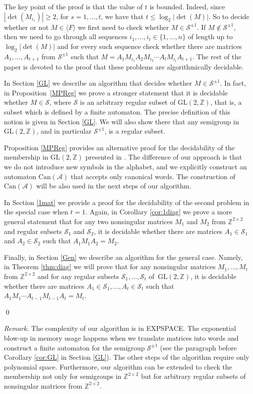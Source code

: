 \documentclass[fontsize=11pt,DIV=13,paper=letter]{scrartcl}
\theoremstyle{definition}
\newcommand{\la}{\langle}
\newcommand{\ra}{\rangle}
\newcommand{\A}{\mathcal{A}}
\newcommand{\Z}{\mathbb{Z}}
\newcommand{\s}{\mathcal{S}}
\newcommand{\GL}{\mathrm{GL}(2,\Z)}
\begin{document}
The key point of the proof is that the value of $t$ is bounded. Indeed, since $|\det(M_{i_s})|\geq 2$, for $s=1,\dots,t$, we have that $t\leq \log_2|\det(M)|$. So to decide whether or not $M\in \la F\ra$ we first need to check whether $M\in \s^{\pm 1}$. If $M\notin \s^{\pm 1}$, then we need to go through all sequences $i_1,\dots,i_t\in \{1,\dots,n\}$ of length up to $\log_2|\det(M)|$ and for every such sequence check whether there are matrices $A_1,\dots,A_{t+1}$ from $\s^{\pm 1}$ such that $M=A_1M_{i_1}A_2M_{i_2}\cdots A_tM_{i_t}A_{t+1}$. The rest of the paper is devoted to the proof that these problems are algorithmically decidable.

In Section \ref{GL} we describe an algorithm that decides whether $M\in \s^{\pm 1}$. In fact, in Proposition~\ref{MPReg} we prove a stronger statement that it is decidable whether $M\in \s$, where $\s$ is an arbitrary regular subset of $\GL$, that is, a subset which is defined by a finite automaton. The precise definition of this notion is given in Section \ref{GL}. We will also show there that any semigroup in $\GL$, and in particular $\s^{\pm 1}$, is a regular subset.

Proposition \ref{MPReg} provides an alternative proof for the decidability of the membership in $\GL$ presented in \cite{CK2005}. The difference of our approach is that we do not introduce new symbols in the alphabet, and we explicitly construct an automaton $\mathrm{Can}(\A)$ that accepts only canonical words. The construction of $\mathrm{Can}(\A)$ will be also used in the next steps of our algorithm.

In Section \ref{1mat} we provide a proof for the decidability of the second problem in the special case when $t=1$. Again, in Corollary \ref{cor:1diag} we prove a more general statement that for any two nonsingular matrices $M_1$ and $M_2$ from $\Z^{2\times 2}$ and regular subsets $\s_1$ and $\s_2$, it is decidable whether there are matrices $A_1\in \s_1$ and $A_2\in \s_2$ such that $A_1M_1A_2=M_2$.

Finally, in Section \ref{Gen} we describe an algorithm for the general case. Namely, in Theorem \ref{thm:diag} we will prove that for any nonsingular matrices $M_1,\dots,M_t$ from $\Z^{2\times 2}$ and for any regular subsets $\s_1,\dots,\s_t$ of~$\GL$, it is decidable whether there are matrices $A_1\in \s_1,\dots,A_t\in \s_t$ such that $A_1M_1\cdots A_{t-1}M_{t-1}A_t=M_t$.

\qed

{\it Remark.} The complexity of our algorithm is in EXPSPACE. The exponential blow-up in memory usage happens when we translate matrices into words and construct a finite automaton for the semigroup $\s^{\pm 1}$ (see the paragraph before Corollary \ref{cor:GL} in Section \ref{GL}). The other steps of the algorithm require only polynomial space.
Furthermore, our algorithm can be extended to check the membership not only for semigroups in $\Z^{2\times 2}$ but for arbitrary regular subsets of nonsingular matrices from $\Z^{2\times 2}$.
\end{document}
